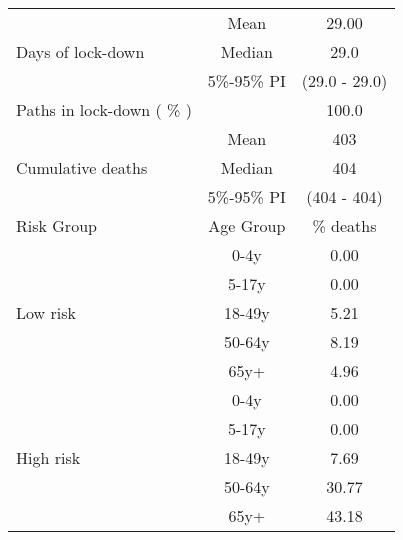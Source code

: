 \documentclass{article}
\begin{document}
\begin{table}[th]
\centering
\begin{tabular}{p{4cm}cc}
\toprule
\multirow{3}{*}{Days   of lock-down} & Mean      & 29.00                        \\ \cmidrule(l){2-3} 
                                     & Median    & 29.0                      \\ \cmidrule(l){2-3} 
                                     & 5\%-95\% PI & (29.0 - 29.0)       \\ \midrule 
\multirow{1}{*}{Paths in lock-down ( \% )} &      &         100.0              \\   \midrule                     
\multirow{3}{\hsize}{Cumulative deaths}       & Mean      & 403 \\ \cmidrule(l){2-3} 
                                     & Median    & 404                        \\ \cmidrule(l){2-3} 
                                     & 5\%-95\% PI & (404 - 404)           \\  \midrule
Risk Group                           & Age Group & \multicolumn{1}{c}{\% deaths}        \\  \midrule
\multirow{5}{*}{Low   risk}          & 0-4y      & 0.00                         \\ \cmidrule(l){2-3} 
                                     & 5-17y     & 0.00                         \\ \cmidrule(l){2-3} 
                                     & 18-49y    & 5.21                         \\ \cmidrule(l){2-3} 
                                     & 50-64y    & 8.19                         \\ \cmidrule(l){2-3} 
                                     & 65y+      & 4.96                         \\ \midrule
\multirow{5}{*}{High   risk}         & 0-4y      & 0.00                         \\ \cmidrule(l){2-3} 
                                     & 5-17y     & 0.00                         \\ \cmidrule(l){2-3} 
                                     & 18-49y    & 7.69                         \\ \cmidrule(l){2-3} 
                                     & 50-64y    & 30.77                         \\ \cmidrule(l){2-3} 
                                     & 65y+      & 43.18                         \\ \midrule

\end{tabular}
\end{table}
\end{document}
